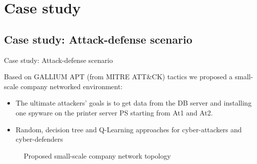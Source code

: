 
 
 \section{Case study}
	
	\subsection{Case study: Attack-defense scenario}
	\begin{frame}{Case study: Attack-defense scenario}
		{}

        Based on GALLIUM APT (from MITRE ATT\&CK) tactics we proposed a small-scale company networked environment:
        \begin{itemize}
            \item The ultimate attackers' goals is to get data from the DB server and installing one spyware on the printer server PS starting from At1 and At2.
            \item Random, decision tree and Q-Learning approaches for cyber-attackers and cyber-defenders
        \end{itemize}

        \begin{figure}
            \centering
            
            \caption{Proposed small-scale company network topology}
            \label{fig:scenario_network_topology}
        \end{figure}
 
	\end{frame}





            
 
